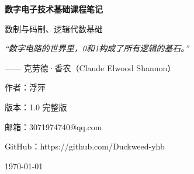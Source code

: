 \begin{titlepage}
    \centering
    \vspace*{3cm}
    
    {\Huge \bfseries 数字电子技术基础课程笔记 \par}
    \vspace{1.5cm}
    
    {\Large 数制与码制、逻辑代数基础 \par}
    \vspace{2cm}
    
    {\itshape \large “数字电路的世界里，0和1构成了所有逻辑的基石。” \par}
    {\large —— 克劳德·香农（Claude Elwood Shannon） \par}
    \vspace{2.5cm}
    
    {\Large 作者：浮萍 \par}
    \vspace{0.5cm}
    
    {\large 版本：1.0 完整版 \par}
    \vspace{0.5cm}
    
    {\large 邮箱：3071974740@qq.com \par}
    \vspace{0.5cm}
    
    {\large GitHub：https://github.com/Duckweed-yhb \par}
    \vspace{1cm}
    
    {\large \today \par}
\end{titlepage}